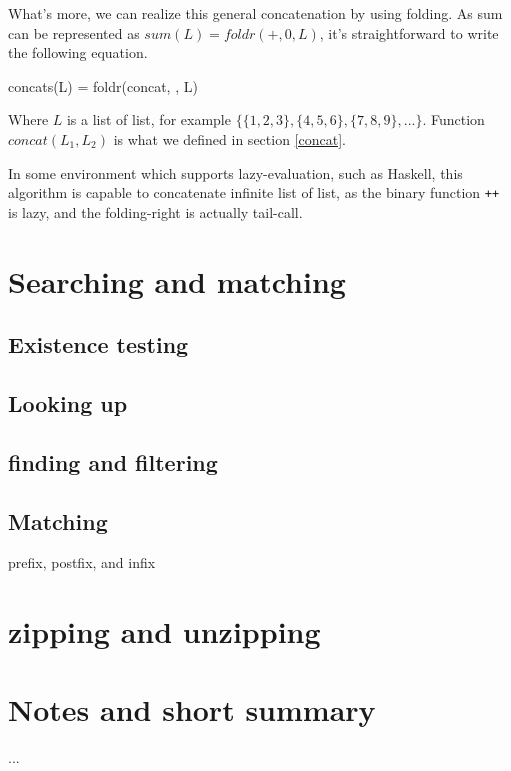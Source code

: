 \documentclass{article}
\begin{document}
What's more, we can realize this general concatenation by using folding. As sum can be represented
as $sum(L) = foldr(+, 0, L)$, it's straightforward to write the following equation.

\be
concats(L) = foldr(concat, \Phi, L)
\ee

Where $L$ is a list of list, for example $\{\{1, 2, 3\}, \{4, 5, 6\}, \{7, 8, 9\}, ...\}$. Function 
$concat(L_1, L_2)$ is what we defined in section \ref{concat}.

In some environment which supports lazy-evaluation, such as Haskell, this algorithm is capable to 
concatenate infinite list of list, as the binary function \verb|++| is lazy, and the folding-right
is actually tail-call.

\section{Searching and matching}

\subsection{Existence testing}

\subsection{Looking up}

\subsection{finding and filtering}



\subsection{Matching}

prefix, postfix, and infix

\section{zipping and unzipping}

\section{Notes and short summary}
...
\end{document}

